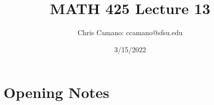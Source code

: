 \documentclass[12pt]{article}
\author{Chris Camano: ccamano@sfsu.edu}
\title{MATH 425  Lecture 13 }
\date{3/15/2022}
\newcommand{\sect}[1]{\section*{#1}}
\begin{document}
\maketitle

\sect{Opening Notes}
\end{document}
